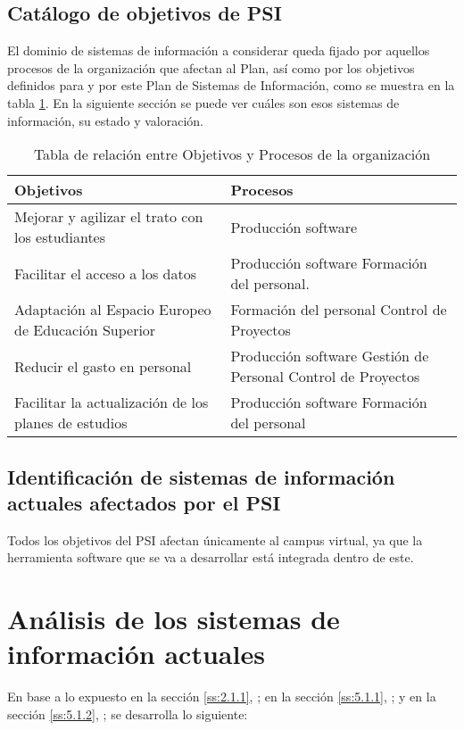 \documentclass[11pt,a4paper,spanish,twoside]{report}
\begin{document}
\subsection{Catálogo de objetivos de PSI} \label{ss:5.1.1}
El dominio de sistemas de información a considerar queda fijado por
aquellos procesos de la organización que afectan al Plan, así como por los 
objetivos definidos para y por este Plan de Sistemas de Información, como se
muestra en la tabla \ref{Tab:ObjPro}. En la siguiente sección se puede ver
cuáles son esos sistemas de información, su estado y valoración.

\begin{table}[!ht]
  \centering
  \begin{tabular}{p{5cm}|p{5cm}}
    \textbf{Objetivos} & \textbf{Procesos} \\
    \hline \hline
    Mejorar y agilizar el trato con los estudiantes & Producción software \\
    \hline
    Facilitar el acceso a los datos & 
    Producción software Formación del personal. \\
    \hline
    Adaptación al Espacio Europeo de Educación Superior & 
    Formación del personal Control de Proyectos \\
    \hline
    Reducir el gasto en personal & 
    Producción software Gestión de Personal Control de Proyectos\\
    \hline
    Facilitar la actualización de los planes de estudios & 
    Producción software Formación del personal \\
    \hline
  \end{tabular}
  \caption{Tabla de relación entre Objetivos y Procesos de la organización}
  \label{Tab:ObjPro}
\end{table}

\subsection{Identificación de sistemas de información actuales afectados por
  el PSI} \label{ss:5.1.2}
Todos los objetivos del PSI afectan únicamente al campus virtual, ya que la
herramienta software que se va a desarrollar está integrada dentro de este.

\section{Análisis de los sistemas de información actuales}
En base a lo expuesto 
en la sección \vref{ss:2.1.1}, \emph{}; 
en la sección \vref{ss:5.1.1}, \emph{}; y
en la sección \vref{ss:5.1.2}, \emph{}; 
se desarrolla lo siguiente:
\end{document}
